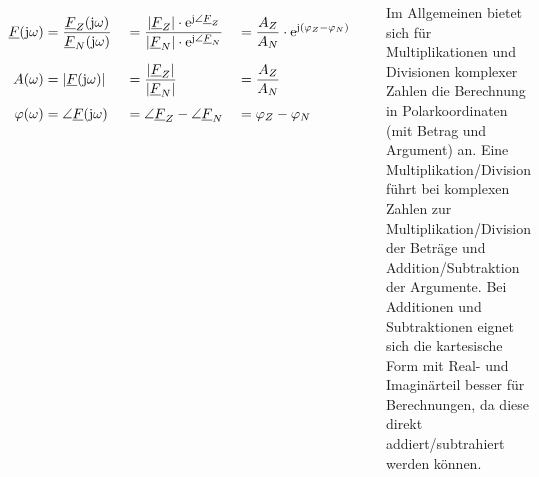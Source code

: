 \begin{frame}[t]
\begin{columns}[T]
{        \begin{align}
            \label{eq:def:F:bruch}
            \underline{F}(\mathrm{j}\omega) 
                            & = \frac{\underline{F}_Z(\mathrm{j}\omega)}{\underline{F}_N(\mathrm{j}\omega)}&
                            & = \frac{|\underline{F}_Z| \cdot \mathrm{e}^{\mathrm{j}\angle{\underline{F}_Z}}}{|\underline{F}_N| \cdot \mathrm{e}^{\mathrm{j}\angle{\underline{F}_N}}}&
                            & = \frac{A_Z}{A_N} \cdot \mathrm{e}^{\mathrm{j} (\varphi_Z - \varphi_N)}
                            \vphantom{\Bigg|}\\
            \label{eq:def:A:bruch}
            A(\omega)       & = |\underline{F}(\mathrm{j}\omega)|&
                            & = \frac{|\underline{F}_Z|}{|\underline{F}_N|}&
                            & = \frac{A_Z}{A_N}&
                            \vphantom{\Bigg|}\\
            \label{eq:def:phi:bruch}
            \varphi(\omega) & = \angle \underline{F}(\mathrm{j}\omega)&
                            & = \angle{\underline{F}_Z} - \angle{\underline{F}_N}&
                            & = \varphi_Z - \varphi_N
        \end{align}

        Im Allgemeinen bietet sich für Multiplikationen und Divisionen komplexer Zahlen die Berechnung in Polarkoordinaten (mit Betrag und Argument) an.
        Eine Multiplikation/Division führt bei komplexen Zahlen zur Multiplikation/Division der Beträge und Addition/Subtraktion der Argumente.
        Bei Additionen und Subtraktionen eignet sich die kartesische Form mit Real- und Imaginärteil besser für Berechnungen, 
        da diese direkt addiert/subtrahiert werden können.
    }
\end{columns}
\end{frame}


